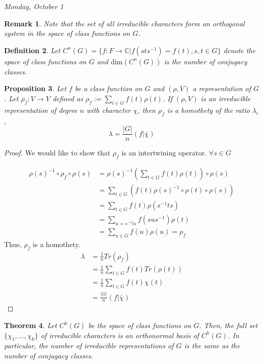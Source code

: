 \documentclass[letterpaper, leqno, 12pt]{article}
\newcommand{\fin}{\qquad \quad \hfill \framebox[1.75mm][l]{\,}}
\providecommand{\abs}[1]{\left\lvert#1\right\rvert}
\newcommand{\bC} {\mathbb{C}}
\newcommand {\repV} {(\rho,V)}
\theoremstyle{stdthm}
\newtheorem{thm}{Theorem}
\newtheorem{prop}[thm]{Proposition}
\theoremstyle{stddef}
\newtheorem{defn}[thm]{Definition}
\newtheorem{rem}[thm]{Remark} %
\theoremstyle{stdnonum}
\theoremstyle{stdqands}
\theoremstyle{stdbold}
\begin{document}
\begin{center}
\emph{Monday,  October 1}
\end{center}


\begin{rem}
Note that the set of all irreducible characters form an orthogonal system in the space of class functions on $G$. 
\end{rem}

\begin{defn}
Let $C^n(G) = \{f: F\rightarrow \bC| f(sts^{-1}) = f(t), s,t\in G \}$ denote the space of class functions on $G$ and $\text{dim} (C^n(G))$ is the number of conjugacy classes. 
\end{defn}

\begin{prop}
Let $f$ be a class function on $G$ and $\repV$ a representation of $G$. Let $\rho_f: V\rightarrow V$ defined as $\rho_f := \sum_{t\in G} f(t)\rho(t)$. If $\repV$ is an irreducible representation of degree $n$ with character $\chi$, then $\rho_f$ is a homothety of the ratio $\lambda_i$, 
\[ \lambda = \frac{\abs{G}}{n} (f|\bar{\chi}) \]
\end{prop}


\begin{proof}
We would like to show that $\rho_f$ is an intertwining operator. $\forall s \in G$

\begin{align*}
\rho(s)^{-1}\circ \rho_f \circ \rho(s) &= \rho(s)^{-1} \left( \sum_{t\in G} f(t)\rho(t) \right) \circ \rho(s)\\
&= \sum_{t\in G} (f(t) \rho(s)^{-1} \circ \rho(t) \circ \rho(s))\\
&= \sum_{t\in G} f(t) \rho(s^{-1}ts)\\
&= \sum_{u= s^{-1}ts} f(sus^{-1})\rho(t)\\
&= \sum_{u\in G} f(u) \rho(u) = \rho_f 
\end{align*}
Thus, $\rho_f$ is a homothety.  
\begin{align*}
\lambda &= \frac{1}{n} Tr(\rho_f)\\
&= \frac{1}{n} \sum_{t\in G} f(t) Tr(\rho(t))\\
&= \frac{1}{n} \sum_{t\in G} f(t)\chi(t)\\
&= \frac{\abs{G}}{n} (f|\bar{\chi})
\end{align*}
\end{proof}

\begin{thm}
Let $C^h(G)$ be the space of class functions on $G$. Then, the full set $\{\chi_1,\dots, \chi_k\}$ of irreducible characters is an orthonormal basis of $C^h(G)$. In particular, the number of irreducible representations of $G$ is the same as the number of conjugacy classes. 
\end{thm}
\end{document}
